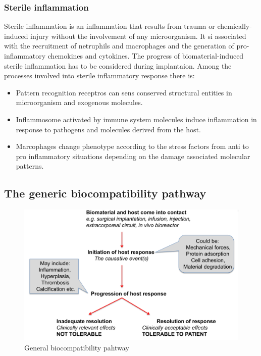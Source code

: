 		\subsubsection{Sterile inflammation}
		Sterile inflammation is an inflammation that results from trauma or chemically-induced injury without the involvement of any microorganism.
		It si associated with the recruitment of netruphils and macrophages and the generation of pro-inflammatory chemokines and cytokines.
		The progress of biomaterial-induced sterile inflammation has to be considered during implantaion.
		Among the processes involved into sterile inflammatory response there is:

		\begin{multicols}{2}
			\begin{itemize}
				\item Pattern recognition receptros can sens conserved structural entities in microorganism and exogenous molecules.
				\item Inflammosome activated by immune system molecules induce inflammation in response to pathogens and molecules derived from the host.
				\item Marcophages change phenotype according to the stress factors from anti to pro inflammatory situations depending on the damage associated molecular patterns.
			\end{itemize}
		\end{multicols}

	\subsection{The generic biocompatibility pathway}

	\begin{figure}[ht]
		\includegraphics[width=\textwidth]{biocomp_pathway.png}
		\caption{General biocompatibility pahtway}
		\label{fig:biocomp_path}
	\end{figure}

